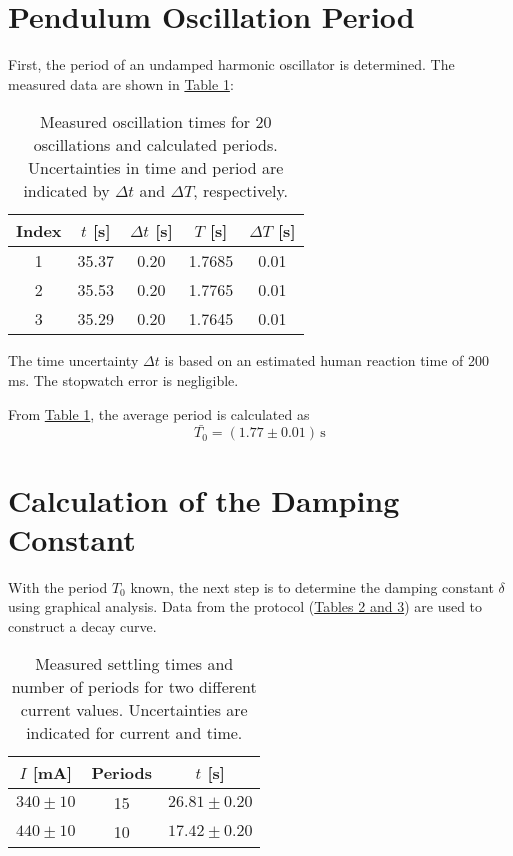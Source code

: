 \twocolumn

\section{Pendulum Oscillation Period}
First, the period of an undamped harmonic oscillator is determined. The measured data are shown in \hyperref[tab:oscillation_data]{Table 1}:

\begin{table}[h!]
    \centering
    \begin{tabular}{c|c|c|c|c}
        \hline
        \textbf{Index} & \textbf{$t$ [s]} & \textbf{$\Delta t$ [s]} & \textbf{$T$ [s]} & \textbf{$\Delta T$ [s]} \\
        \hline
        1 & 35.37 & 0.20 & 1.7685 & 0.01 \\
        2 & 35.53 & 0.20 & 1.7765 & 0.01 \\
        3 & 35.29 & 0.20 & 1.7645  & 0.01 \\
        \hline
    \end{tabular}
    \caption{Measured oscillation times for 20 oscillations and calculated periods. Uncertainties in time and period are indicated by $\Delta t$ and $\Delta T$, respectively.}
    \label{tab:oscillation_data}
\end{table}

The time uncertainty $\Delta t$ is based on an estimated human reaction time of 200 ms. The stopwatch error is negligible. 

From \hyperref[tab:oscillation_data]{Table 1}, the average period is calculated as
\begin{equation}
    \boxed{\bar{T_0} = (1.77 \pm 0.01)\,\mathrm{s}}
\end{equation}

\section{Calculation of the Damping Constant}
With the period $T_0$ known, the next step is to determine the damping constant $\delta$ using graphical analysis. Data from the protocol (\hyperref[tab:settling_times]{Tables 2 and 3}) are used to construct a decay curve.

\begin{table}[h!]
    \centering
    \begin{tabular}{c|c|c}
        \hline
        \textbf{$I$ [mA]} & \textbf{Periods} & \textbf{$t$ [s]} \\
        \hline
        $340 \pm 10$ & 15 & $26.81 \pm 0.20$ \\
        $440 \pm 10$ & 10 & $17.42 \pm 0.20$ \\
        \hline
    \end{tabular}
    \caption{Measured settling times and number of periods for two different current values. Uncertainties are indicated for current and time.}
    \label{tab:settling_times}
\end{table}

